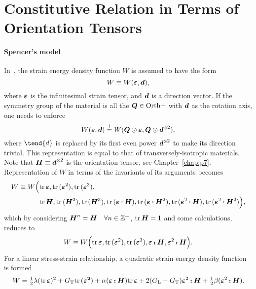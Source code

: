 \section{Constitutive Relation in Terms of Orientation Tensors}
	\paragraph{Spencer's model} In~\parencite{Spencer.1984}, the strain energy density function $W$  is assumed to have the form
	\begin{equation}
	W\equiv W(\tenb{\varepsilon},\tena{d}),
	\end{equation}
	where $\tenb{\varepsilon}$ is the infinitesimal strain tensor, and $\tena{d}$ is a direction vector. If the symmetry group of the material is all the $\tenb{Q}\in\orthpset$ with $\tena{d}$ as the rotation axis, one needs to enforce
	\begin{equation}
	W(\tenb{\varepsilon},\tena{d})\equimust W(\tenb{Q}\Rayleigh\tenb{\varepsilon},\tenb{Q}\Rayleigh\tena{d}^\tenpow{2}),
	\end{equation}
	where $\tend{d}$ is replaced by its first even power $\tena{d}^\tenpow{2}$ to make its direction trivial. This representation is equal to that of transversely-isotropic materials. Note that $\tenb{H}\equiv \tena{d}^\tenpow{2}$ is the orientation tensor, see Chapter~\ref{chap:p7}. Representation of $W$ in terms of the invariants of its arguments becomes~\autocite{Ottosen.2005}
	\begin{alignat}{1}
	W\equiv W\Big(&\tr\tenb{\varepsilon},\tr(\tenb{\varepsilon}^2),\tr(\tenb{\varepsilon}^3), \\\nonumber
	&\tr\tenb{H}, \tr(\tenb{H}^2), \tr(\tenb{H}^3), 
	 \tr(\tenb{\varepsilon}\scp\tenb{H}), \tr(\tenb{\varepsilon}\scp\tenb{H}^2), \tr(\tenb{\varepsilon}^2\scp\tenb{H}), \tr(\tenb{\varepsilon}^2\scp\tenb{H}^2)\Big),
	\end{alignat}
	which by considering $\tenb{H}^n=\tenb{H}\quad \forall n\in\Integer^+$, $\tr\tenb{H}=1$ and some calculations, reduces to 
	\begin{equation}
	W\equiv W\Big(\tr\tenb{\varepsilon},\tr(\tenb{\varepsilon}^2),\tr(\tenb{\varepsilon}^3),\tenb{\varepsilon}\dscp\tenb{H},\tenb{\varepsilon}^2\dscp\tenb{H}\Big).
	\end{equation}	%
	For a linear stress-strain relationship, a quadratic strain energy density function is formed
	\begin{equation}
	W=\half\lambda(\tr\tenb{\varepsilon})^2+G_\text{T}\tr(\tenb{\varepsilon^2})+\alpha(\tenb{\varepsilon}\dscp\tenb{H})\tr\tenb{\varepsilon}+2(G_\text{L}-G_\text{T})\tenb{\varepsilon}^2\dscp\tenb{H}+\half\beta(\tenb{\varepsilon}^2\dscp\tenb{H}).
	\end{equation}
